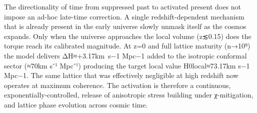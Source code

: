The directionality of time from suppressed past to activated present does not impose an ad-hoc late-time correction. 
A single redshift-dependent mechanism that is already present in the early universe slowly unmask itself as the cosmos expands.
Only when the universe approaches the local volume (z≲0.15) does the torque reach its calibrated magnitude. 
At z=0 and full lattice maturity (n→10⁹) the model delivers ΔH≈+3.17km s−1 Mpc−1 added to the isotropic conformal sector (≈70km s⁻¹ Mpc⁻¹) producing the target local value H0local≈73.17km s−1 Mpc−1.
The same lattice that was effectively negligible at high redshift now operates at maximum coherence. 
The activation is therefore a continuous, exponentially-controlled, release of anisotropic stress building under χ-mitigation, and lattice phase evolution across cosmic time.
